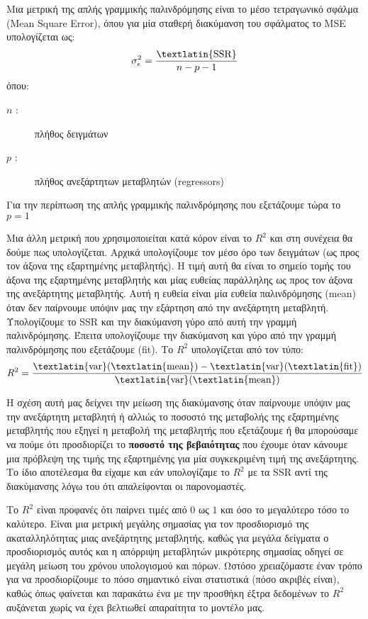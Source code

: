 \sloppy
Μια μετρική της απλής γραμμικής παλινδρόμησης είναι το μέσο τετραγωνικό σφάλμα (\textlatin{Mean Square Error}),
όπου για μία σταθερή διακύμανση του σφάλματος το \textlatin{MSE} υπολογίζεται ως:
\fussy
$$\sigma_\epsilon^2=\frac{\text{\textlatin{SSR}}}{n-p-1}$$
όπου:
\begin{description}
    \item[$n$ :] πλήθος δειγμάτων
    \item[$p$ :] πλήθος ανεξάρτητων μεταβλητών (\textlatin{regressors})
\end{description}
Για την περίπτωση της απλής γραμμικής παλινδρόμησης που εξετάζουμε τώρα το $p=1$

Μια άλλη μετρική που χρησιμοποιείται κατά κόρον είναι το $R^2$ και στη συνέχεια θα δούμε πως υπολογίζεται.
Αρχικά υπολογίζουμε τον μέσο όρο των δειγμάτων (ως προς τον άξονα της εξαρτημένης
μεταβλητής). Η τιμή αυτή θα είναι το σημείο τομής του άξονα της εξαρτημένης μεταβλητής
και μίας ευθείας παράλληλης ως προς τον άξονα της ανεξάρτητης μεταβλητής. Αυτή η ευθεία
είναι μία ευθεία παλινδρόμησης (\textlatin{mean}) όταν δεν παίρνουμε υπόψιν μας την εξάρτηση από
την ανεξάρτητη μεταβλητή. Υπολογίζουμε το \textlatin{SSR} και την διακύμανση γύρο από αυτή την
γραμμή παλινδρόμησης. Έπειτα υπολογίζουμε την διακύμανση και γύρο από την γραμμή
παλινδρόμησης που εξετάζουμε (\textlatin{fit}). Το $R^2$ υπολογίζεται από τον τύπο:
$$R^2=\frac{\text{\textlatin{var}}(\text{\textlatin{mean}})-\text{\textlatin{var}}(\text{\textlatin{fit}})}{\text{\textlatin{var}}(\text{\textlatin{mean}})}$$

Η σχέση αυτή μας δείχνει την μείωση της διακύμανσης όταν παίρνουμε υπόψιν μας την
ανεξάρτητη μεταβλητή ή αλλιώς το ποσοστό της μεταβολής της εξαρτημένης μεταβλητής που
εξηγεί η μεταβολή της μεταβλητής που εξετάζουμε ή θα μπορούσαμε να πούμε ότι
προσδιορίζει το \textbf{ποσοστό της βεβαιότητας} που έχουμε όταν κάνουμε μια πρόβλεψη της τιμής
της εξαρτημένης για μία συγκεκριμένη τιμή της ανεξάρτητης. Το ίδιο αποτέλεσμα θα είχαμε
και εάν υπολογίζαμε το $R^2$ με τα \textlatin{SSR} αντί της διακύμανσης λόγω του ότι απαλείφονται οι
παρονομαστές.

Το $R^2$
είναι προφανές ότι παίρνει τιμές από $0$ ως $1$ και όσο το μεγαλύτερο
τόσο το καλύτερο. Είναι μια μετρική μεγάλης σημασίας για τον προσδιορισμό της
ακαταλληλότητας μιας ανεξάρτητης μεταβλητής, καθώς για μεγάλα δείγματα ο
προσδιορισμός αυτός και η απόρριψη μεταβλητών μικρότερης σημασίας οδηγεί σε μεγάλη
μείωση του χρόνου υπολογισμού και πόρων. Ωστόσο χρειαζόμαστε έναν τρόπο για να
προσδιορίζουμε το πόσο σημαντικό είναι στατιστικά (πόσο ακριβές είναι), καθώς όπως
φαίνεται και παρακάτω ένα με την προσθήκη έξτρα δεδομένων το $R^2$ αυξάνεται χωρίς να έχει
βελτιωθεί απαραίτητα το μοντέλο μας.

